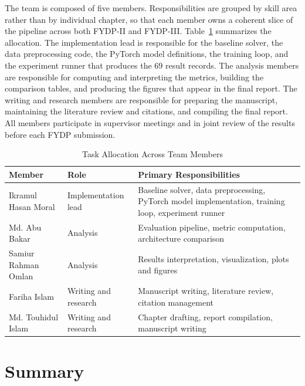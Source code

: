 The team is composed of five members. Responsibilities are grouped by skill area rather than by individual chapter, so that each member owns a coherent slice of the pipeline across both FYDP-II and FYDP-III. Table~\ref{tab:tasks} summarizes the allocation. The implementation lead is responsible for the baseline solver, the data preprocessing code, the PyTorch model definitions, the training loop, and the experiment runner that produces the $69$ result records. The analysis members are responsible for computing and interpreting the metrics, building the comparison tables, and producing the figures that appear in the final report. The writing and research members are responsible for preparing the manuscript, maintaining the literature review and citations, and compiling the final report. All members participate in supervisor meetings and in joint review of the results before each FYDP submission.

\begin{table}[!ht]
\centering
\caption{Task Allocation Across Team Members}
\label{tab:tasks}
\renewcommand{\arraystretch}{1.2}
\begin{tabular}{|p{4.0cm}|p{3.0cm}|p{6.5cm}|}
\hline
\textbf{Member} & \textbf{Role} & \textbf{Primary Responsibilities} \\
\hline
Ikramul Hasan Moral & Implementation lead & Baseline solver, data preprocessing, PyTorch model implementation, training loop, experiment runner \\
\hline
Md. Abu Bakar & Analysis & Evaluation pipeline, metric computation, architecture comparison \\
\hline
Samiur Rahman Omlan & Analysis & Results interpretation, visualization, plots and figures \\
\hline
Fariha Islam & Writing and research & Manuscript writing, literature review, citation management \\
\hline
Md. Touhidul Islam & Writing and research & Chapter drafting, report compilation, manuscript writing \\
\hline
\end{tabular}
\end{table}

\section{Summary}

